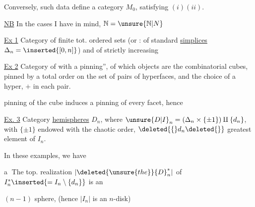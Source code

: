 Conversely, such data define a category $M_0$, satisfying $(i)(ii)$.

\uline{NB} In the cases I have in mind, $\mathbb N=\unsure{\mathbb N|N}$

\uline{Ex 1} Category of finite tot. ordered sets (or : of standard \uline{simplices} $\Delta_n=\inserted{[0,n]}$) and of strictly increasing 

\uline{Ex 2} Category of   with a pinning'',  of which  objects are the  combinatorial cubes,
  pinned by a total order on the set of pairs of hyperfaces,  and the choice of a hyper,   $+$ in each pair.

 pinning of the cube induces a pinning of every facet, hence  

\uline{Ex. 3} Category   \uline{hemispheres} $D_n$, where $ {\unsure{D|I}}_n=(\Delta_n\times\{\pm1\})\amalg\{d_n\}$, with $\{\pm1\}$ endowed with the chaotic order, $\deleted{\{}d_n\deleted{\}}$  greatest element of $I_n$.

In  these  examples, we have

\textcircled{a}  The top. realization $|\deleted{\unsure{the}} {D}_n^*|$ of $I_n^*\inserted{=I_n\setminus\{d_n\}}$ is an 

 $(n-1)$ sphere, (hence $|I_n|$ is an $n$-disk)
